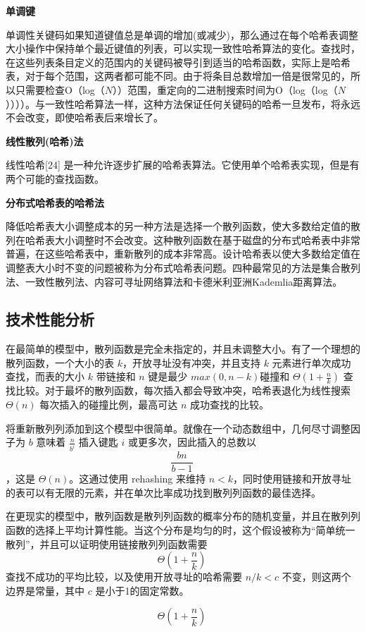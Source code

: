 \textbf{单调键}

单调性关键码如果知道键值总是单调的增加(或减少)，那么通过在每个哈希表调整大小操作中保持单个最近键值的列表，可以实现一致性哈希算法的变化。查找时，在这些列表条目定义的范围内的关键码被导引到适当的哈希函数，实际上是哈希表，对于每个范围，这两者都可能不同。由于将条目总数增加一倍是很常见的，所以只需要检查O（log（$N$））范围，重定向的二进制搜索时间为O（log（log（$N$））））。与一致性哈希算法一样，这种方法保证任何关键码的哈希一旦发布，将永远不会改变，即使哈希表后来增长了。

\textbf{线性散列(哈希)法}

线性哈希[24] 是一种允许逐步扩展的哈希表算法。它使用单个哈希表实现，但是有两个可能的查找函数。

\textbf{分布式哈希表的哈希法}

降低哈希表大小调整成本的另一种方法是选择一个散列函数，使大多数给定值的散列在哈希表大小调整时不会改变。这种散列函数在基于磁盘的分布式哈希表中非常普遍，在这些哈希表中，重新散列的成本非常高。设计哈希表以使大多数给定值在调整表大小时不变的问题被称为分布式哈希表问题。四种最常见的方法是集合散列法、一致性散列法、内容可寻址网络算法和卡德米利亚洲Kademlia距离算法。

\subsection{技术性能分析}
在最简单的模型中，散列函数是完全未指定的，并且未调整大小。有了一个理想的散列函数，一个大小的表 $k$，开放寻址没有冲突，并且支持 $k$ 元素进行单次成功查找，而表的大小 $k$ 带链接和 $n$ 键是最少 $max(0,n-k)$碰撞和 $\Theta(1+\frac{n}{k})$ 查找比较。对于最坏的散列函数，每次插入都会导致冲突，哈希表退化为线性搜索 $\Theta(n)$ 每次插入的碰撞比例，最高可达 $n$ 成功查找的比较。

将重新散列列添加到这个模型中很简单。就像在一个动态数组中，几何尽寸调整因子为 $b$ 意味着 $\frac{n}{b^i}$ 插入键匙 $i$ 或更多次，因此插入的总数以 $$\frac{bn}{b-1}~$$ ，这是 $\Theta(n)$。这通过使用 rehashing 来维持 $n<k$，同时使用链接和开放寻址的表可以有无限的元素，并在单次比率成功找到散列列函数的最佳选择。

在更现实的模型中，散列函数是散列列函数的概率分布的随机变量，并且在散列列函数的选择上平均计算性能。当这个分布是均匀的时，这个假设被称为“简单统一散列”，并且可以证明使用链接散列列函数需要 $$\Theta(1+\frac{n}{k})~$$ 查找不成功的平均比较，以及使用开放寻址的哈希需要 $n/k<c$ 不变，则这两个边界是常量，其中 $c$ 是小于1的固定常数。

$$\Theta(1+\frac{n}{k})~$$
